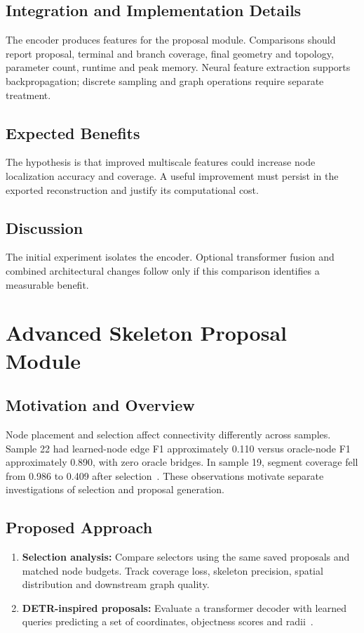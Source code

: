 \documentclass[11pt,a4paper]{article}
\begin{document}
\subsection{Integration and Implementation Details}
The encoder produces features for the proposal module. Comparisons should report proposal, terminal and branch coverage, final geometry and topology, parameter count, runtime and peak memory. Neural feature extraction supports backpropagation; discrete sampling and graph operations require separate treatment.

\subsection{Expected Benefits}
The hypothesis is that improved multiscale features could increase node localization accuracy and coverage. A useful improvement must persist in the exported reconstruction and justify its computational cost.

\subsection{Discussion}
The initial experiment isolates the encoder. Optional transformer fusion and combined architectural changes follow only if this comparison identifies a measurable benefit.

\section{Advanced Skeleton Proposal Module}

\subsection{Motivation and Overview}
Node placement and selection affect connectivity differently across samples. Sample 22 had learned-node edge F1 approximately 0.110 versus oracle-node F1 approximately 0.890, with zero oracle bridges. In sample 19, segment coverage fell from 0.986 to 0.409 after selection~\cite{report,diagnostics}. These observations motivate separate investigations of selection and proposal generation.

\subsection{Proposed Approach}
\begin{enumerate}
    \item \textbf{Selection analysis:} Compare selectors using the same saved proposals and matched node budgets. Track coverage loss, skeleton precision, spatial distribution and downstream graph quality.
    \item \textbf{DETR-inspired proposals:} Evaluate a transformer decoder with learned queries predicting a set of coordinates, objectness scores and radii~\cite{detr}.
\end{enumerate}
\end{document}
